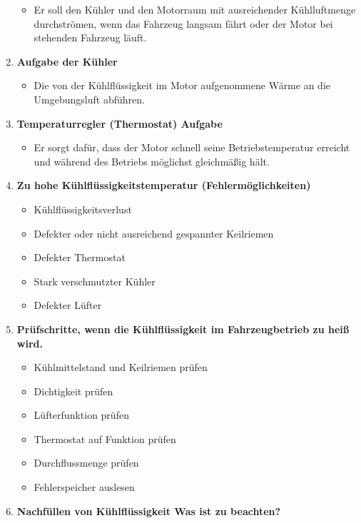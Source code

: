 \begin{enumerate}
  \begin{itemize}
  \item
    Er soll den Kühler und den Motorraum mit ausreichender Kühlluftmenge
    durchströmen, wenn das Fahrzeug langsam fährt oder der Motor bei
    stehenden Fahrzeug läuft.
  \end{itemize}
\item
  \textbf{Aufgabe der Kühler}

  \begin{itemize}
  \item
    Die von der Kühlflüssigkeit im Motor aufgenommene Wärme an die
    Umgebungsluft abführen.
  \end{itemize}
\item
  \textbf{Temperaturregler (Thermostat) Aufgabe}

  \begin{itemize}
  \item
    Er sorgt dafür, dass der Motor schnell seine Betriebstemperatur
    erreicht und während des Betriebs möglichst gleichmäßig hält.
  \end{itemize}
\item
  \textbf{Zu hohe Kühlflüssigkeitstemperatur (Fehlermöglichkeiten)}

  \begin{itemize}
  \item
    Kühlflüssigkeitsverlust
  \item
    Defekter oder nicht ausreichend gespannter Keilriemen
  \item
    Defekter Thermostat
  \item
    Stark verschmutzter Kühler
  \item
    Defekter Lüfter
  \end{itemize}
\item
  \textbf{Prüfschritte, wenn die Kühlflüssigkeit im Fahrzeugbetrieb zu
  heiß wird.}

  \begin{itemize}
  \item
    Kühlmittelstand und Keilriemen prüfen
  \item
    Dichtigkeit prüfen
  \item
    Lüfterfunktion prüfen
  \item
    Thermostat auf Funktion prüfen
  \item
    Durchflussmenge prüfen
  \item
    Fehlerspeicher auslesen
  \end{itemize}
\item
  \textbf{Nachfüllen von Kühlflüssigkeit Was ist zu beachten?}


\end{enumerate}
